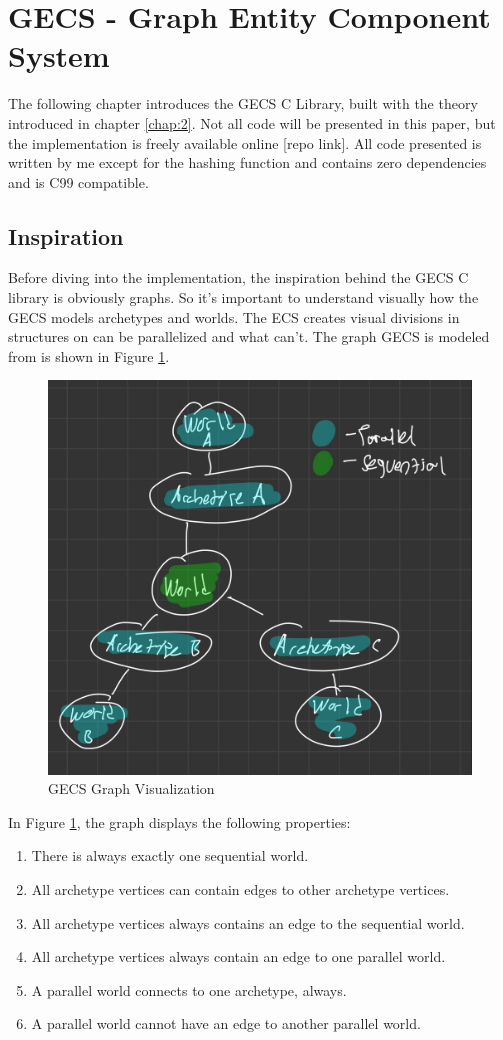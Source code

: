 \section{GECS - Graph Entity Component System}
\label{chap:3}

The following chapter introduces the GECS C Library, built with the theory introduced in chapter \ref{chap:2}. Not all code will be presented in this paper, but the implementation is freely available online [repo link]. All code presented is written by me except for the hashing function and contains zero dependencies and is C99 compatible.

\subsection{Inspiration}
Before diving into the implementation, the inspiration behind the GECS C library is obviously graphs. So it's important to understand visually how the GECS models archetypes and worlds. The ECS creates visual divisions in structures on can be parallelized and what can't. The graph GECS is modeled from is shown in Figure \ref{fig:gecs_graph}.

\begin{figure}[H]
    \centering
    \includegraphics[width=0.5\linewidth]{resources/gecs_graph.png}
    \caption{GECS Graph Visualization}
    \label{fig:gecs_graph}
\end{figure}

In Figure \ref{fig:gecs_graph}, the graph displays the following properties:
\begin{enumerate}
    \item There is always exactly one sequential world.
    \item All archetype vertices can contain edges to other archetype vertices.
    \item All archetype vertices always contains an edge to the sequential world.
    \item All archetype vertices always contain an edge to one parallel world.
    \item A parallel world connects to one archetype, always.
    \item A parallel world cannot have an edge to another parallel world.
\end{enumerate}

